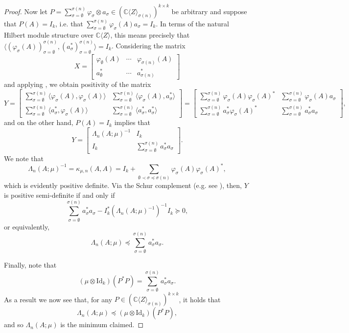 \documentclass[11pt,reqno]{amsart}
\def\p{\varphi}
\def\k{\kappa}
\def\s{\sigma}
\def\L{\Lambda}
\def\CC{\mathbb{C}}
\theoremstyle{definition}
\numberwithin{equation}{section}
\begin{document}
\begin{proof}
    Now let \(P = \sum_{\s = \emptyset}^{\s(n)} \p_\s \otimes a_\s \in (\CC\langle Z \rangle_{\s(n)})^{k\times k}\) be arbitrary and suppose that \(P(A) = I_k\), i.e. that \(\sum_{\s = \emptyset}^{\s(n)} \p_\s(A) a_\s = I_k\). In terms of the natural Hilbert module structure over \(\CC\langle Z \rangle\), this means precisely that \(\langle(\p_\s(A))_{\s = \emptyset}^{\s(n)}, (a^*_\s)_{\s = \emptyset}^{\s(n)}\rangle = I_k\). Considering the matrix
    \[
        X = \begin{bmatrix}\p_{\emptyset}(A) & \cdots & \p_{\s(n)}(A) \\ a_{\emptyset}^* & \cdots & a_{\s(n)}^* \end{bmatrix}
    \]
    and applying \cite[Theorem 14.10]{Pau02}, we obtain positivity of the matrix 
    \[
        Y = \begin{bmatrix} \sum_{\s = \emptyset}^{\s(n)} \langle\p_\s(A), \p_\s(A)\rangle & \sum_{\s = \emptyset}^{\s(n)} \langle \p_\s(A), a_\s^*\rangle \\ \sum_{\s = \emptyset}^{\s(n)} \langle a_\s^*, \p_\s(A) \rangle & \sum_{\s = \emptyset}^{\s(n)} \langle a_\s^*, a_\s^* \rangle \end{bmatrix} = \begin{bmatrix} \sum_{\s = \emptyset}^{\s(n)} \p_\s(A) \p_\s(A)^* & \sum_{\s = \emptyset}^{\s(n)} \p_\s(A) a_\s \\ \sum_{\s = \emptyset}^{\s(n)} a_\s^* \p_\s(A)^* & \sum_{\s = \emptyset}^{\s(n)} a_\s^* a_\s \end{bmatrix},
    \]
    and on the other hand, \(P(A) = I_k\) implies that
    \[
        Y = \begin{bmatrix}\L_{n}(A; \mu)^{-1} & I_k \\ I_k & \sum_{\s = \emptyset}^{\s(n)} a_\s^* a_\s \end{bmatrix}.
    \]
    We note that
    \[
        \L_n(A; \mu)^{-1} = \k_{\mu, n}(A,A) = I_k + \sum_{\emptyset \prec \s \preceq \s(n)}  \p_\s(A)\p_\s(A)^*,
    \]
    which is evidently positive definite. Via the Schur complement (e.g. see \cite[Remark 2.4.6]{BW11}), then, \(Y\) is positive semi-definite if and only if
    \[
        \sum_{\s = \emptyset}^{\s(n)} a_\s^* a_\s - I_k^* \left(\L_{n}(A; \mu)^{-1}\right)^{-1}I_k \succeq 0,
    \]
    or equivalently,
    \[
        \L_n(A; \mu) \preceq \sum_{\s = \emptyset}^{\s(n)} a_\s^* a_\s.
    \]
    
    Finally, note that
    \[
        (\mu \otimes \mathrm{Id}_k)(P^*P) = \sum_{\s = \emptyset}^{\s(n)} a_\s^* a_\s.
    \]
    As a result we now see that, for any \(P \in (\CC\langle Z \rangle_{\s(n)})^{k\times k}\), it holds that
    \[
        \L_{n}(A; \mu) \preceq (\mu \otimes \mathrm{Id}_k)(P^*P),
    \]
    and so \(\L_{n}(A; \mu)\) is the minimum claimed.    
\end{proof}
\end{document}
